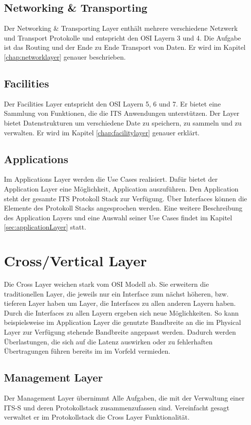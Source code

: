 \subsection{Networking \& Transporting \label{architektur_networkingTransporting}}
Der Networking \& Transporting Layer enthält mehrere verschiedene Netzwerk und Transport Protokolle und entspricht den \ac{OSI} Layern 3 und 4. Die Aufgabe ist das Routing und der Ende zu Ende Transport von Daten. Er wird im Kapitel \ref{chap:networklayer} genauer beschrieben. 


\subsection{Facilities}
Der Facilities Layer entspricht den \ac{OSI} Layern 5, 6 und 7. Er bietet eine Sammlung von Funktionen, die die \ac{ITS} Anwendungen unterstützen. Der Layer bietet Datenstrukturen um verschiedene Date zu speichern, zu sammeln und zu verwalten. Er wird im Kapitel \ref{chap:facilitylayer} genauer erklärt.

\subsection{Applications}
Im Applications Layer werden die Use Cases realisiert. Dafür bietet der Application Layer eine Möglichkeit, Application auszuführen. Den Application steht der gesamte \ac{ITS} Protokoll Stack zur Verfügung. Über Interfaces können die Elemente des Protokoll Stacks angesprochen werden.
Eine weitere Beschreibung des Application Layers und eine Auswahl seiner Use Cases findet im Kapitel \ref{sec:applicationLayer} statt.

\section{Cross/Vertical Layer}
Die Cross Layer weichen stark vom \ac{OSI} Modell ab. Sie erweitern die traditionellen Layer, die jeweils nur ein Interface zum nächst höheren, bzw. tieferen Layer haben um Layer, die Interfaces zu allen anderen Layern haben. Durch die Interfaces zu allen Layern ergeben sich neue Möglichkeiten. So kann beispielsweise im Application Layer die genutzte Bandbreite an die im Physical Layer zur Verfügung stehende Bandbreite angepasst werden. Dadurch werden Überlastungen, die sich auf die Latenz auswirken oder zu fehlerhaften Übertragungen führen bereits im im Vorfeld vermieden.

\subsection{Management Layer \label{architektur_managementLayer}}
Der Management Layer übernimmt Alle Aufgaben, die mit der Verwaltung einer \ac{ITS-S} und deren Protokollstack zusammenzufassen sind. Vereinfacht gesagt verwaltet er im Protokollstack die Cross Layer Funktionalität. 


